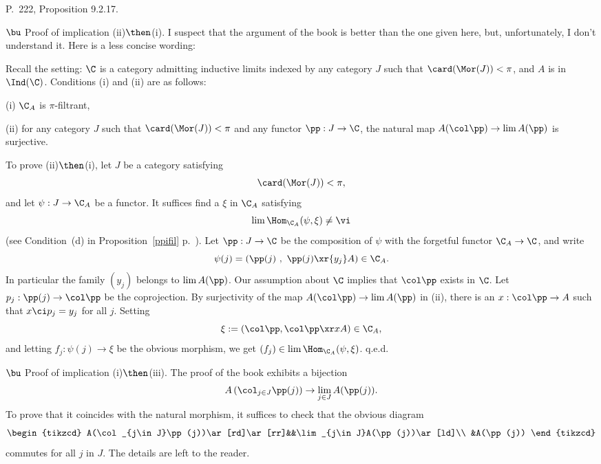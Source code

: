 \documentclass[12pt]{article}
\theoremstyle{remark}
\theoremstyle{definition}
\begin{document}
%

\begin{s} 
P.~222, Proposition 9.2.17.

\nn$\bu$ Proof of implication (ii)$\then$(i). I suspect that the argument of the book is better than the one given here, but, unfortunately, I don't understand it. Here is a less concise wording:

Recall the setting: $\C$ is a category admitting inductive limits indexed by any category $J$ such that $\card(\Mor(J))<\pi$, and $A$ is in $\Ind(\C)$. Conditions (i) and (ii) are as follows: 

\nn(i) $\C_A$ is $\pi$-filtrant, 

\nn(ii) for any category $J$ such that $\card(\Mor(J))<\pi$ and any functor $\pp:J\to\C$, the natural map $A(\col\pp)\to\lim A(\pp)$ is surjective. 

To prove (ii)$\then$(i), let $J$ be a category satisfying 
$$
\card(\Mor(J))<\pi,
$$ 
and let $\psi:J\to\C_A$ be a functor. It suffices find a $\xi$ in $\C_A$ satisfying 
$$
\lim\Hom_{\C_A}(\psi,\xi)\neq\vi
$$ 
(see Condition~(d) in Proposition~\ref{ppifil} p.~). Let $\pp:J\to\C$ be the composition of $\psi$ with the forgetful functor $\C_A\to\C$, and write 
$$
\psi(j)=\left(\pp(j)\ ,\ \pp(j)\xr{y_j}A\right)\in\C_A.
$$ 
In particular the family $(y_j)$ belongs to $\lim A(\pp)$. Our assumption about $\C$ implies that $\col\pp$ exists in $\C$. Let $p_j:\pp(j)\to\col\pp$ be the coprojection. By surjectivity of the map $A(\col\pp)\to\lim A(\pp)$ in (ii), there is an $x:\col\pp\to A$ such that $x\ci p_j=y_j$ for all $j$. Setting 
$$
\xi:=\left(\col\pp,\col\pp\xr x A\right)\in\C_A,
$$ 
and letting $f_j:\psi(j)\to\xi$ be the obvious morphism, we get $(f_j)\in\lim\Hom_{\C_A}(\psi,\xi)$. q.e.d. 

\nn$\bu$ Proof of implication (i)$\then$(iii). The proof of the book exhibits a bijection 
$$
A\left(\col_{j\in J}\pp(j)\right)\to\lim_{j\in J}A(\pp(j)).
$$ 
To prove that it coincides with the natural morphism, it suffices to check that the obvious diagram
$$
\begin{tikzcd}
A(\col_{j\in J}\pp(j))\ar[rd]\ar[rr]&&\lim_{j\in J}A(\pp(j))\ar[ld]\\ 
&A(\pp(j))
\end{tikzcd}
$$ 
commutes for all $j$ in $J$. The details are left to the reader.
\end{s}


\end{document}
